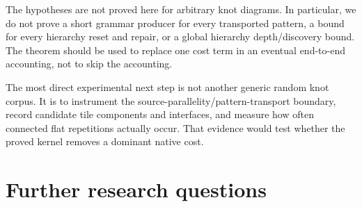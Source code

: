 \documentclass[11pt]{article}
\theoremstyle{remark}\newtheorem{remark}[theorem]{Remark}
\begin{document}
The hypotheses are not proved here for arbitrary knot diagrams. In particular, we do not prove a short grammar producer for every transported pattern, a bound for every hierarchy reset and repair, or a global hierarchy depth/discovery bound. The theorem should be used to replace one cost term in an eventual end-to-end accounting, not to skip the accounting.

The most direct experimental next step is not another generic random knot corpus. It is to instrument the source-parallelity/pattern-transport boundary, record candidate tile components and interfaces, and measure how often connected flat repetitions actually occur. That evidence would test whether the proved kernel removes a dominant native cost.

\section{Further research questions}
\end{document}

